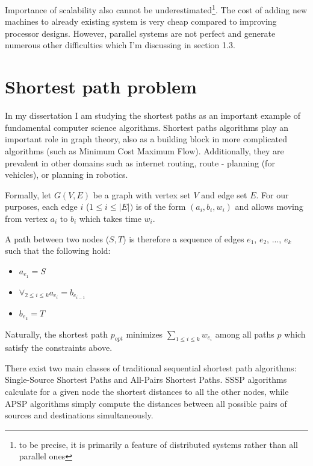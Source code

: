 \documentclass[12pt,a4paper,twoside,openright]{report}
\begin{document}
Importance of scalability also cannot be underestimated\footnote{to be precise, it is primarily a feature of distributed systems rather than all parallel ones}. The cost of adding new machines to already existing system is very cheap compared to improving processor designs. 
However, parallel systems are not perfect and generate numerous other difficulties which I'm discussing in section 1.3.

\section{Shortest path problem}
In my dissertation I am studying the shortest paths as an important example of fundamental computer science algorithms. Shortest paths algorithms play an important role in graph theory, also as a building block in more complicated algorithms (such as Minimum Cost Maximum Flow). Additionally, they are prevalent in other domains such as internet routing, route - planning (for vehicles), or planning in robotics. 

Formally, let $G(V,E)$ be a graph with vertex set $V$ and edge set $E$. For our purposes, each edge $i$ ($1\leq i\leq |E|)$ is of the form $(a_i, b_i, w_i)$ and allows moving from vertex $a_i$ to $b_i$ which takes time $w_i$. 

A path between two nodes ($S, T$) is therefore a sequence of edges $e_1$, $e_2$, ..., $e_k$ such that the following hold:
\begin{itemize}
    \item $a_{e_1} = S$
    \item $\displaystyle\mathop{\forall}_{2\leq i \leq k} a_{e_{i}} = b_{e_{i-1}}$
    \item $b_{e_k} = T$
\end{itemize}

Naturally, the shortest path $p_{opt}$ minimizes $\displaystyle\mathop{\sum}_{1\leq i \leq k} w_{e_i}$ among all paths $p$ which satisfy the constraints above.

There exist two main classes of traditional sequential shortest path algorithms: Single-Source Shortest Paths and All-Pairs Shortest Paths. SSSP algorithms calculate for a given node the shortest distances to all the other nodes, while APSP algorithms simply compute the distances between all possible pairs of sources and destinations simultaneously.
\end{document}
